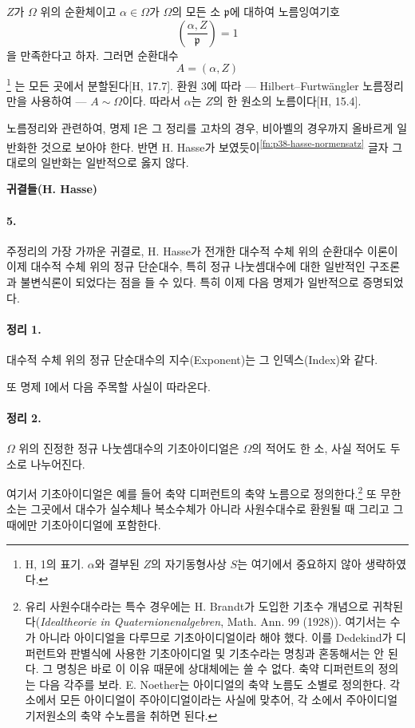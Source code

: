 \(Z\)가 \(\Omega\) 위의 순환체이고 \(\alpha\in\Omega\)가 \(\Omega\)의 모든 소 \(\mathfrak p\)에 대하여 노름잉여기호
\[
\left(\frac{\alpha,Z}{\mathfrak p}\right)=1
\]
을 만족한다고 하자. 그러면 순환대수
\[
A=(\alpha,Z)
\]
\footnote{\label{fn:p38-hasse-notation}H, 1의 표기. \(\alpha\)와 결부된 \(Z\)의 자기동형사상 \(S\)는 여기에서 중요하지 않아 생략하였다.}
는 모든 곳에서 분할된다[H, 17.7]. 환원 3에 따라 --- Hilbert--Furtwängler 노름정리만을 사용하여 --- \(A\sim\Omega\)이다. 따라서 \(\alpha\)는 \(Z\)의 한 원소의 노름이다[H, 15.4].

노름정리와 관련하여, 명제 I은 그 정리를 고차의 경우, 비아벨의 경우까지 올바르게 일반화한 것으로 보아야 한다. 반면 H. Hasse가 보였듯이\textsuperscript{\ref{fn:p38-hasse-normensatz}} 글자 그대로의 일반화는 일반적으로 옳지 않다.

\begin{center}
\textbf{귀결들(H. Hasse)}
\end{center}

\paragraph{5.}
주정리의 가장 가까운 귀결로, H. Hasse가 전개한 대수적 수체 위의 순환대수 이론이 이제 대수적 수체 위의 정규 단순대수, 특히 정규 나눗셈대수에 대한 일반적인 구조론과 불변식론이 되었다는 점을 들 수 있다. 특히 이제 다음 명제가 일반적으로 증명되었다.

\paragraph{정리 1.}
대수적 수체 위의 정규 단순대수의 지수(Exponent)는 그 인덱스(Index)와 같다.

또 명제 I에서 다음 주목할 사실이 따라온다.

\paragraph{정리 2.}
\(\Omega\) 위의 진정한 정규 나눗셈대수의 기초아이디얼은 \(\Omega\)의 적어도 한 소, 사실 적어도 두 소로 나누어진다.

여기서 기초아이디얼은 예를 들어 축약 디퍼런트의 축약 노름으로 정의한다.\footnote{유리 사원수대수라는 특수 경우에는 H. Brandt가 도입한 \glqq{}기초수\grqq{} 개념으로 귀착된다(\emph{Idealtheorie in Quaternionenalgebren}, Math. Ann. 99 (1928)). 여기서는 수가 아니라 아이디얼을 다루므로 \glqq{}기초아이디얼\grqq{}이라 해야 했다. 이를 Dedekind가 디퍼런트와 판별식에 사용한 기초아이디얼 및 기초수라는 명칭과 혼동해서는 안 된다. 그 명칭은 바로 이 이유 때문에 상대체에는 쓸 수 없다. 축약 디퍼런트의 정의는 다음 각주를 보라. E. Noether는 아이디얼의 축약 노름도 \glqq{}소별로\grqq{} 정의한다. 각 소에서 모든 아이디얼이 주아이디얼이라는 사실에 맞추어, 각 소에서 주아이디얼 기저원소의 축약 수노름을 취하면 된다.} 또 무한소는 그곳에서 대수가 실수체나 복소수체가 아니라 사원수대수로 환원될 때 그리고 그때에만 기초아이디얼에 포함한다.


